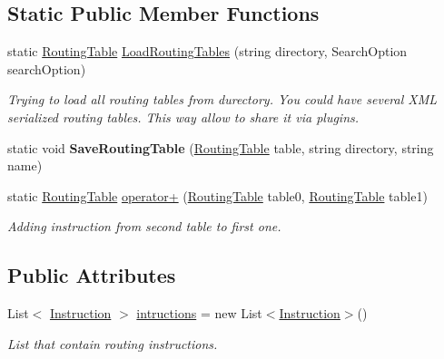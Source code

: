 \subsection*{Static Public Member Functions}
\begin{DoxyCompactItemize}
\item 
static \mbox{\hyperlink{class_pipes_provider_1_1_networking_1_1_routing_1_1_routing_table}{Routing\+Table}} \mbox{\hyperlink{class_pipes_provider_1_1_networking_1_1_routing_1_1_routing_table_a13c2778abb1d14e7e8e4a2ae51d315ac}{Load\+Routing\+Tables}} (string directory, Search\+Option search\+Option)
\begin{DoxyCompactList}\small\item\em Trying to load all routing tables from durectory. You could have several X\+ML serialized routing tables. This way allow to share it via plugins. \end{DoxyCompactList}\item 
\mbox{\label{class_pipes_provider_1_1_networking_1_1_routing_1_1_routing_table_a1fe9c42819cd5c5210b254c0d868b336}} 
static void {\bfseries Save\+Routing\+Table} (\mbox{\hyperlink{class_pipes_provider_1_1_networking_1_1_routing_1_1_routing_table}{Routing\+Table}} table, string directory, string name)
\item 
static \mbox{\hyperlink{class_pipes_provider_1_1_networking_1_1_routing_1_1_routing_table}{Routing\+Table}} \mbox{\hyperlink{class_pipes_provider_1_1_networking_1_1_routing_1_1_routing_table_a515b9ad19dc868afb6d47c762064fd96}{operator+}} (\mbox{\hyperlink{class_pipes_provider_1_1_networking_1_1_routing_1_1_routing_table}{Routing\+Table}} table0, \mbox{\hyperlink{class_pipes_provider_1_1_networking_1_1_routing_1_1_routing_table}{Routing\+Table}} table1)
\begin{DoxyCompactList}\small\item\em Adding instruction from second table to first one. \end{DoxyCompactList}\end{DoxyCompactItemize}
\subsection*{Public Attributes}
\begin{DoxyCompactItemize}
\item 
List$<$ \mbox{\hyperlink{class_pipes_provider_1_1_networking_1_1_routing_1_1_instruction}{Instruction}} $>$ \mbox{\hyperlink{class_pipes_provider_1_1_networking_1_1_routing_1_1_routing_table_a1a2c8459b4805d7ee1e81698a389f3f7}{intructions}} = new List$<$\mbox{\hyperlink{class_pipes_provider_1_1_networking_1_1_routing_1_1_instruction}{Instruction}}$>$()
\begin{DoxyCompactList}\small\item\em List that contain routing instructions. \end{DoxyCompactList}\end{DoxyCompactItemize}
